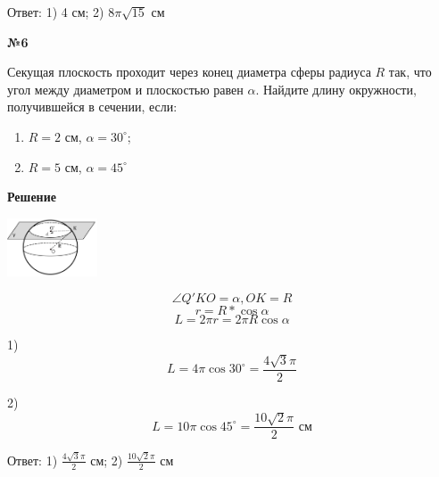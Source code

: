     Ответ: 1) 4 см; 2) $8 \pi \sqrt {15}$ см

    \begin{center}
        \textbf{№6}
    \end{center}

    Секущая плоскость проходит через конец диаметра сферы радиуса $R$ так,
    что угол между диаметром и плоскостью равен $\alpha$.
    Найдите длину окружности, получившейся в сечении, если:
    \begin{enumerate}
        \item $R = 2$ см, $\alpha = 30 ^{\circ}$;
        \item $R = 5$ см, $\alpha = 45 ^{\circ}$
    \end{enumerate}

     \textbf{Решение}\\

    \begin{center}
        \includegraphics[width=0.2\textwidth]{images/img5}\\
    \end{center}

     \[\angle Q'KO = \alpha , OK = R\]
    \[ r = R * \cos \alpha \]
    \[ L = 2\pi r = 2 \pi R  \cos \alpha \]

    1)
    \[ L = 4\pi \cos 30^{\circ} = \frac{4\sqrt {3}\pi}{2} \] 

    2)
    \[
        L = 10 \pi \cos 45^{\circ} = \frac{10\sqrt {2}\pi}{2} \text{ см}
    \]

    Ответ: 1) $\frac{4\sqrt {3}\pi}{2}$ см; 2) $\frac{10\sqrt {2}\pi}{2}$ см


